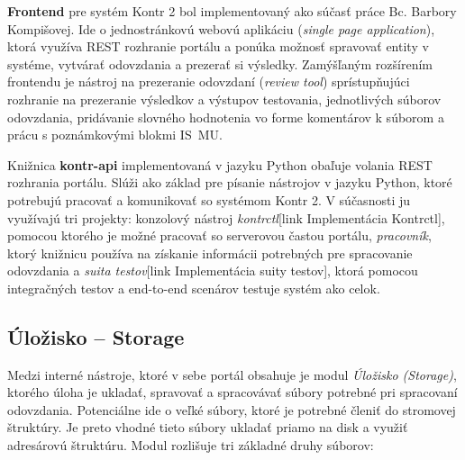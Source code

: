 \documentclass[
  digital, %
  twoside, %
  table,   %
  lof,     %
  lot,     %
]{fithesis3}
\begin{document}
\textbf{Frontend} pre systém Kontr 2 bol implementovaný ako súčasť práce Bc. Barbory Kompišovej. Ide o jednostránkovú webovú aplikáciu (\emph{single page application}), ktorá využíva REST rozhranie portálu a ponúka možnosť spravovať entity v systéme, vytvárať odovzdania a prezerať si výsledky. Zamýšľaným rozšírením frontendu je nástroj na prezeranie odovzdaní (\emph{review tool}) sprístupňujúci rozhranie na prezeranie výsledkov a výstupov testovania, jednotlivých súborov odovzdania, pridávanie slovného hodnotenia vo forme komentárov k súborom a prácu s poznámkovými blokmi IS~MU. 

Knižnica \textbf{kontr-api} implementovaná v jazyku Python obaľuje volania REST rozhrania portálu. Slúži ako základ pre písanie nástrojov v jazyku Python, ktoré potrebujú pracovať a komunikovať so systémom Kontr 2. V súčasnosti ju využívajú tri projekty: konzolový nástroj \emph{kontrctl}[link Implementácia Kontrctl], pomocou ktorého je možné pracovať so serverovou častou portálu, \emph{pracovník}, ktorý knižnicu používa na získanie informácii potrebných pre spracovanie odovzdania a \emph{suita testov}[link Implementácia suity testov], ktorá pomocou integračných testov a end-to-end scenárov testuje systém ako celok.




\subsection{Úložisko -- Storage}

Medzi interné nástroje, ktoré v sebe portál obsahuje je modul \emph{Úložisko (Storage)}, ktorého úloha je ukladať, spravovať a spracovávať súbory potrebné pri spracovaní odovzdania. Potenciálne ide o veľké súbory, ktoré je potrebné členiť do stromovej štruktúry. Je preto vhodné tieto súbory ukladať priamo na disk a využiť adresárovú štruktúru. Modul rozlišuje tri základné druhy súborov: 
\end{document}
